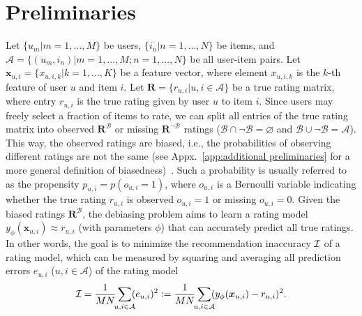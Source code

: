 \documentclass[letterpaper]{article} %
\newcommand{\matrixize}[1]{\mathbf{#1}}
\newcommand{\vectorize}[1]{\bm{#1}}
\newcommand{\lrdense}[2]{\smashoperator[lr]{#1_{#2}}}
\newcommand{\defeq}{\vcentcolon=}
\newcommand{\nUser}{M}
\newcommand{\iUser}{m}
\newcommand{\nItem}{N}
\newcommand{\iItem}{n}
\newcommand{\allPairs}{\mathcal{A}}
\newcommand{\obsBiasedPairs}{\mathcal{B}}
\newcommand{\misBiasedPairs}{{\lnot\mathcal{B}}}
\newcommand{\propensity}{p_{u,i}}
\newcommand{\trueRatings}{\matrixize{R}}
\newcommand{\biasedRating}{r_{u,i}}
\newcommand{\obsIndicator}{o}
\newcommand{\observation}{\obsIndicator_{u,i}}
\newcommand{\nFeature}{K}
\newcommand{\iFeature}{k}
\newcommand{\featureMark}{x}
\newcommand{\biasedFeatures}{\vectorize{\featureMark}_{u,i}}
\newcommand{\feature}{\featureMark_{u,i,\iFeature}}
\newcommand{\inaccuracy}[1]{\mathcal{I}_{\rm #1}}
\newcommand{\ratingName}{y}
\newcommand{\ratingParam}{\phi}
\newcommand{\ratingModel}{\ratingName_\ratingParam(\biasedFeatures)}
\newcommand{\trueError}{e_{u,i}}
\begin{document}
\section{Preliminaries}
Let $\{u_\iUser|\iUser=1,...,\nUser\}$ be users, $\{i_\iItem|\iItem=1,...,\nItem\}$ be items, and $\allPairs=\{(u_\iUser,i_\iItem)|\iUser=1,...,\nUser;\iItem=1,...,\nItem\}$ be all user-item pairs.
Let $\biasedFeatures=\{\feature|\iFeature=1,...,\nFeature\}$ be a feature vector, where element $\feature$ is the $\iFeature$-th feature of user $u$ and item $i$.
Let $\trueRatings=\{\biasedRating|u,i\in\allPairs\}$ be a true rating matrix, where entry $\biasedRating$ is the true rating given by user $u$ to item $i$.
Since users may freely select a fraction of items to rate, we can split all entries of the true rating matrix into observed $\trueRatings^\obsBiasedPairs$ or missing $\trueRatings^\misBiasedPairs$ ratings ($\obsBiasedPairs\cap\misBiasedPairs=\varnothing$ and $\obsBiasedPairs\cup\misBiasedPairs=\allPairs$).
This way, the observed ratings are biased, i.e., the probabilities of observing different ratings are not the same (see Appx.~\ref{app:additional preliminaries} for a more general definition of biasedness)~\cite{marlin2007collaborative}.
Such a probability is usually referred to as the propensity $\propensity=p(\observation=1)$, where $\observation$ is a Bernoulli variable indicating whether the true rating $\biasedRating$ is observed $\observation=1$ or missing $\observation=0$.
Given the biased ratings $\trueRatings^\obsBiasedPairs$, the debiasing problem aims to learn a rating model $\ratingModel\approx\biasedRating$ (with parameters $\ratingParam$) that can accurately predict all true ratings.
In other words, the goal is to minimize the recommendation inaccuracy $\inaccuracy{}$ of a rating model, which can be measured by squaring and averaging all prediction errors $\trueError$ ($u,i\in\allPairs$) of the rating model
\begin{equation*}
\inaccuracy{}
=\frac{1}{\nUser\nItem}
\lrdense{\sum}{u,i\in\allPairs}(\trueError)^2
\defeq\frac{1}{\nUser\nItem}
\lrdense{\sum}{u,i\in\allPairs}(\ratingModel-\biasedRating)^2.
\end{equation*}%
\end{document}
